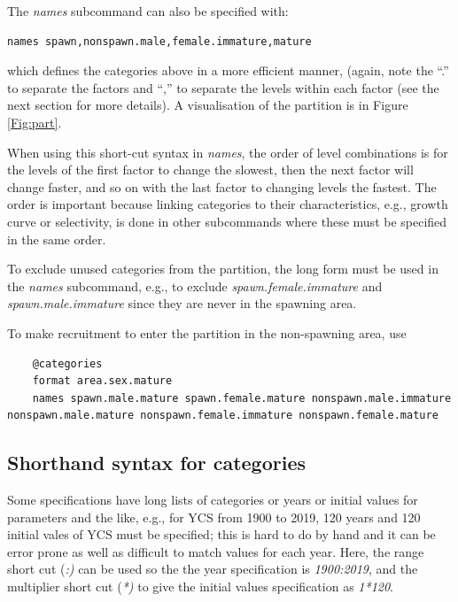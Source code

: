 The \textit{names} subcommand can also be specified with:

{\small{\begin{verbatim}names spawn,nonspawn.male,female.immature,mature
\end{verbatim}}}

which defines the categories above in a more efficient manner, (again, note the ``.'' to separate the factors and ``,'' to separate the levels within each factor (see the next section for more details). A visualisation of the partition is in Figure \ref{Fig:part}.

When using this short-cut syntax in \textit{names}, the order of level combinations is for the levels of the first factor to change the slowest, then the next factor will change faster, and so on with the last factor to changing levels the fastest. The order is important because linking categories to their characteristics, e.g., growth curve or selectivity, is done in other subcommands where these must be specified in the same order.

To exclude unused categories from the partition, the long form must be used in the \textit{names} subcommand, e.g., to exclude  \textit{spawn.female.immature} and \textit{spawn.male.immature} since they are never in the spawning area.

To make recruitment to enter the partition in the non-spawning area, use

{\small{\begin{lstlisting}
	@categories
	format area.sex.mature
	names spawn.male.mature spawn.female.mature nonspawn.male.immature nonspawn.male.mature nonspawn.female.immature nonspawn.female.mature
\end{lstlisting}}}

\subsection{Shorthand syntax for categories}\label{sec:ShorthandSyntax}

Some specifications have long lists of categories or years or initial values for parameters and the like, e.g., for YCS from 1900 to 2019, 120 years and 120 initial vales of YCS must be specified; this is hard to do by hand and it can be error prone as well as difficult to match values for each year. Here, the range short cut (\textit{:)} can be used so the  the year specification is \textit{1900:2019}, and the multiplier short cut (\textit{*)} to give the initial values specification as \textit{1*120}.

